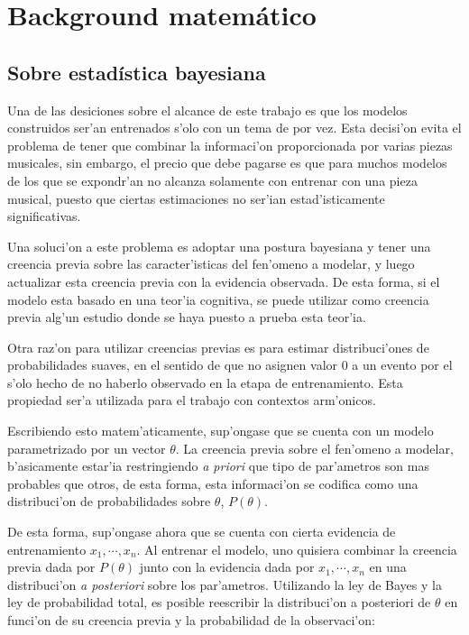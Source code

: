 
\section{Background matem\'atico}
\subsection{Sobre estad\'istica bayesiana}
Una de las desiciones sobre el alcance de este trabajo es que los modelos construidos ser'an entrenados s'olo con un tema de por vez. 
Esta decisi'on evita el problema de tener que combinar la informaci'on proporcionada por varias piezas musicales, sin embargo, el precio que debe pagarse 
es que para muchos modelos de los que se expondr'an no alcanza solamente con entrenar con una pieza musical, puesto que ciertas estimaciones no ser'ian estad'isticamente 
significativas. 

Una soluci'on a este problema es adoptar una postura bayesiana y tener una creencia previa sobre las caracter'isticas del fen'omeno a modelar, 
y luego actualizar esta creencia previa con la evidencia observada. De esta forma, si el modelo esta basado en una teor'ia cognitiva, se puede utilizar
como creencia previa alg'un estudio donde se haya puesto a prueba esta teor'ia. 

Otra raz'on para utilizar creencias previas es para estimar distribuci'ones de probabilidades suaves, en el sentido de que no asignen valor $0$ a un evento 
por el s'olo hecho de no haberlo observado en la etapa de entrenamiento. Esta propiedad ser'a utilizada para el trabajo con contextos arm'onicos.

Escribiendo esto matem'aticamente, sup'ongase que se cuenta con un modelo parametrizado por un vector $\theta$. 
La creencia previa sobre el fen'omeno a modelar, b'asicamente estar'ia restringiendo \emph{a priori} que tipo de par'ametros son mas probables que otros, 
de esta forma, esta informaci'on se codifica como una distribuci'on de probabilidades sobre $\theta$, $P(\theta)$. 

De esta forma, sup'ongase ahora que se cuenta con cierta evidencia de entrenamiento $x_1,\cdots,x_n$. Al entrenar el modelo, uno quisiera combinar la 
creencia previa dada por $P(\theta)$ junto con la evidencia dada por $x_1,\cdots,x_n$ en una distribuci'on \emph{a posteriori} sobre los par'ametros.
Utilizando la ley de Bayes y la ley de probabilidad total, es posible reescribir la distribuci'on a posteriori de $\theta$ en funci'on de su creencia previa y 
la probabilidad de la observaci'on:

